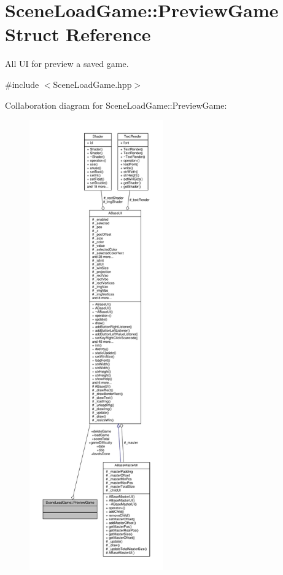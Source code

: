 \hypertarget{struct_scene_load_game_1_1_preview_game}{}\section{Scene\+Load\+Game\+:\+:Preview\+Game Struct Reference}
\label{struct_scene_load_game_1_1_preview_game}


All UI for preview a saved game.  




{\ttfamily \#include $<$Scene\+Load\+Game.\+hpp$>$}



Collaboration diagram for Scene\+Load\+Game\+:\+:Preview\+Game\+:
\nopagebreak
\begin{figure}[H]
\begin{center}
\leavevmode
\includegraphics[height=550pt]{struct_scene_load_game_1_1_preview_game__coll__graph}
\end{center}
\end{figure}
